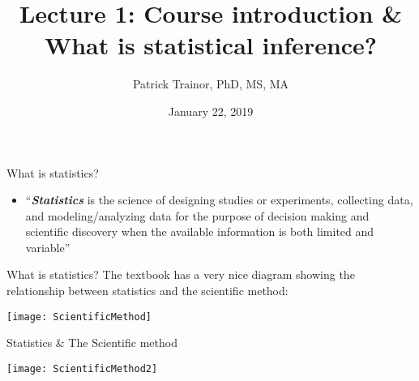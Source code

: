 \documentclass[xcolor=dvipsnames]{beamer}
\title[Lecture 1]{Lecture 1: Course introduction \& What is statistical inference?}
\author[Patrick Trainor]{Patrick Trainor, PhD, MS, MA}
\institute[NMSU]{New Mexico State University}
\date{January 22, 2019}
\begin{document}
	
\begin{frame}
    \maketitle
\end{frame}

\begin{frame}{What is statistics?}
	\begin{itemize}
		\item ``\textbf{\textit{Statistics}} is the science of designing studies or experiments, collecting data, and modeling/analyzing data for the purpose of decision making and scientific discovery when the available information is both limited and variable''
	\end{itemize}
\end{frame}

\begin{frame}{What is statistics?}
	\vspace{-12pt}
	The textbook has a very nice diagram showing the relationship between statistics and the scientific method: \vspace{5pt}
	
	\begin{center}
		\texttt{[image: ScientificMethod]}
	\end{center}
\end{frame}

\begin{frame}{Statistics \& The Scientific method}
	\vspace{-12pt}
	\begin{center}
		\texttt{[image: ScientificMethod2]}
	\end{center}
\end{frame}
\end{document}
